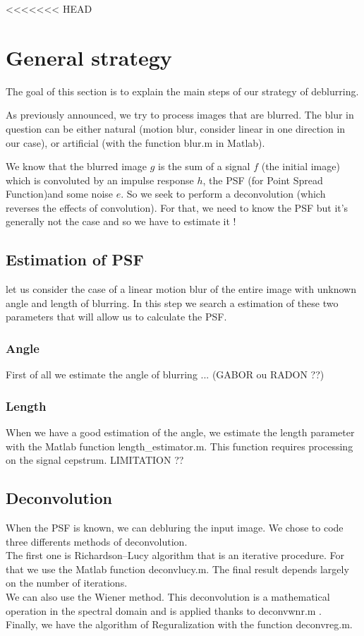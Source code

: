<<<<<<< HEAD


\chapter{General strategy}

The goal of this section is to explain the main steps of our strategy of deblurring.

As previously announced, we try to process images that are blurred. The blur in question can be either natural (motion blur, consider linear in one direction in our case), or artificial (with the function blur.m in Matlab).

We know that the blurred image $g$ is the sum of a signal $f$ (the initial image) which is convoluted by an impulse response $h$, the PSF (for Point Spread Function)and some noise $e$. So we seek to perform a deconvolution (which reverses the effects of convolution). For that, we need to know the PSF but it's generally not the case and so we have to estimate it ! 
  
\section{Estimation of PSF}

let us consider the case of a linear motion blur of the entire image with unknown angle and length of blurring. In this step we search a estimation of these two parameters that will allow us to calculate the PSF. 
\subsection{Angle}
First of all we estimate the angle of blurring ... (GABOR ou RADON ??)

\subsection{Length}
When we have a good estimation of the angle, we estimate the length parameter with the Matlab function length_estimator.m. This function requires processing on the signal cepstrum. 
LIMITATION ??

\section{Deconvolution}

When the PSF is known, we can debluring the input image. We chose to code three differents methods of deconvolution.
\\
The first one is Richardson–Lucy algorithm that is an iterative procedure. For that we use the Matlab function deconvlucy.m. The final result depends largely on the number of iterations.
\\ 
We can also use the Wiener method. This deconvolution is a mathematical operation in the spectral domain and is applied thanks to deconvwnr.m .
\\
Finally, we have the algorithm of Reguralization with the function deconvreg.m.

